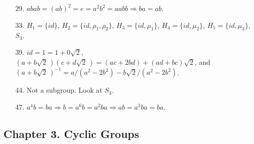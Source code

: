 {\begin{itemize}
\bf\item[29.]\rm
$abab = (ab)^2 = e = a^2 b^2 = aabb\Rightarrow  ba = ab$.
 
\bf\item[33.]\rm
$H_1 = \{ id \}$, $H_2 = \{ id, \rho_1, \rho_2  \}$, $H_3 = \{ id,
\mu_1 \}$, $H_4 = \{ id, \mu_2 \}$, $H_5 = \{ id, \mu_3 \}$, $S_3$.
 
\bf\item[39.]\rm
$id = 1 = 1 + 0 \sqrt{2}$, $(a + b \sqrt{2}\, )(c + d \sqrt{2}\, ) = 
(ac + 2bd) + (ad + bc)\sqrt{2}$, and $(a + b \sqrt{2}\, )^{-1} = a/(a^2
-2b^2) - b\sqrt{2}/(a^2 - 2 b^2)$.
 
\bf\item[44.]\rm
Not a subgroup. Look at $S_3$.
 
\bf\item[47.]\rm
$a^4b =ba \Rightarrow b = a^6 b = a^2 b a \Rightarrow ab = a^3 b a =
ba$. 
 
\end{itemize}
}
 
\subsection*{Chapter 3. Cyclic Groups}
 
